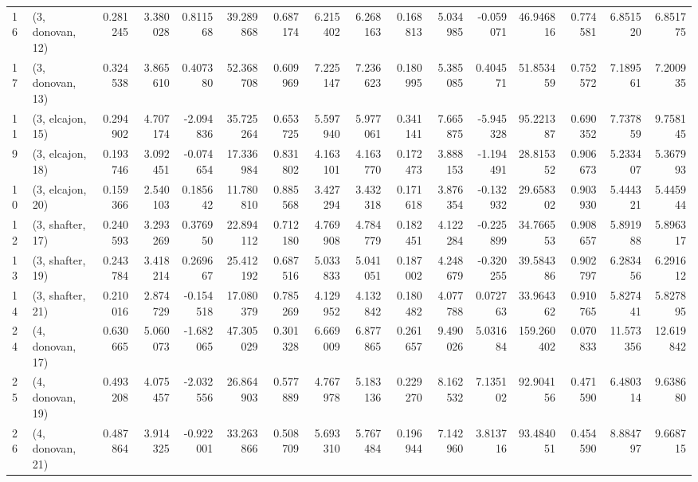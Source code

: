\begin{tabular}{llrrrrrrrrrrrrrr}
16 &  (3, donovan, 12) &   0.281245 &  3.380028 &  0.811568 &  39.289868 &  0.687174 &   6.215402 &  6.268163 &  0.168813 &  5.034985 & -0.059071 &   46.946816 &  0.774581 &   6.851520 &   6.851775 \\
17 &  (3, donovan, 13) &   0.324538 &  3.865610 &  0.407380 &  52.368708 &  0.609969 &   7.225147 &  7.236623 &  0.180995 &  5.385085 &  0.404571 &   51.853459 &  0.752572 &   7.189561 &   7.200935 \\
11 &  (3, elcajon, 15) &   0.294902 &  4.707174 & -2.094836 &  35.725264 &  0.653725 &   5.597940 &  5.977061 &  0.341141 &  7.665875 & -5.945328 &   95.221387 &  0.690352 &   7.737859 &   9.758145 \\
9  &  (3, elcajon, 18) &   0.193746 &  3.092451 & -0.074654 &  17.336984 &  0.831802 &   4.163101 &  4.163770 &  0.172473 &  3.888153 & -1.194491 &   28.815352 &  0.906673 &   5.233407 &   5.367993 \\
10 &  (3, elcajon, 20) &   0.159366 &  2.540103 &  0.185642 &  11.780810 &  0.885568 &   3.427294 &  3.432318 &  0.171618 &  3.876354 & -0.132932 &   29.658302 &  0.903930 &   5.444321 &   5.445944 \\
12 &  (3, shafter, 17) &   0.240593 &  3.293269 &  0.376950 &  22.894112 &  0.712180 &   4.769908 &  4.784779 &  0.182451 &  4.122284 & -0.225899 &   34.766553 &  0.908657 &   5.891988 &   5.896317 \\
13 &  (3, shafter, 19) &   0.243784 &  3.418214 &  0.269667 &  25.412192 &  0.687516 &   5.033833 &  5.041051 &  0.187002 &  4.248679 & -0.320255 &   39.584386 &  0.902797 &   6.283456 &   6.291612 \\
14 &  (3, shafter, 21) &   0.210016 &  2.874729 & -0.154518 &  17.080379 &  0.785269 &   4.129952 &  4.132842 &  0.180482 &  4.077788 &  0.072763 &   33.964362 &  0.910765 &   5.827441 &   5.827895 \\
24 &  (4, donovan, 17) &   0.630665 &  5.060073 & -1.682065 &  47.305029 &  0.301328 &   6.669009 &  6.877865 &  0.261657 &  9.490026 &  5.031684 &  159.260402 &  0.070833 &  11.573356 &  12.619842 \\
25 &  (4, donovan, 19) &   0.493208 &  4.075457 & -2.032556 &  26.864903 &  0.577889 &   4.767978 &  5.183136 &  0.229270 &  8.162532 &  7.135102 &   92.904156 &  0.471590 &   6.480314 &   9.638680 \\
26 &  (4, donovan, 21) &   0.487864 &  3.914325 & -0.922001 &  33.263866 &  0.508709 &   5.693310 &  5.767484 &  0.196944 &  7.142960 &  3.813716 &   93.484051 &  0.454590 &   8.884797 &   9.668715 \\

\end{tabular}
